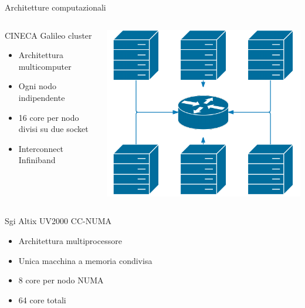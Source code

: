 \documentclass[8pt]{beamer}
\begin{document}
\begin{frame}{Architetture computazionali}

\vspace{-1cm}

\begin{columns}
	\begin{block}{CINECA Galileo cluster}
		\begin{itemize}
			\item Architettura multicomputer
			\item Ogni nodo indipendente
			\item 16 core per nodo divisi su due socket
			\item Interconnect Infiniband
		\end{itemize}
	\end{block}

			\begin{center}
				\includegraphics[height=0.4\textheight]{beam_galileo_schema.pdf}
			\end{center}
\end{columns}

\begin{columns}
	\begin{block}{Sgi Altix UV2000 CC-NUMA}
		\begin{itemize}
			\item Architettura multiprocessore
			\item Unica macchina a memoria condivisa
			\item 8 core per nodo NUMA
			\item 64 core totali
		\end{itemize}
	\end{block}
	

\end{columns}
\end{frame}
\end{document}
